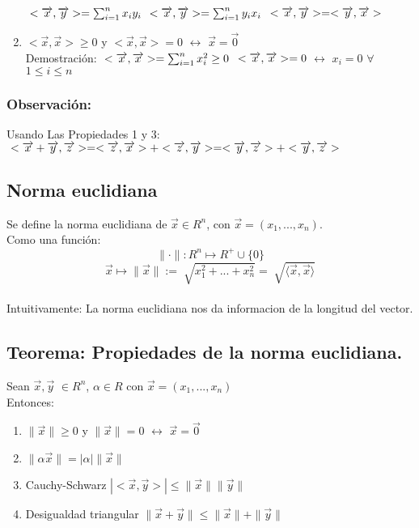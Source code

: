 \documentclass{book}
\begin{document}
\begin{enumerate}
    $\\<\overrightarrow{x},\overrightarrow{y}>=\sum_{i=1}^{n}x_{i}y_{i}$
    $\\<\overrightarrow{x},\overrightarrow{y}>=\sum_{i=1}^{n}y_{i}x_{i}$
    $\\<\overrightarrow{x},\overrightarrow{y}>=<\overrightarrow{y},\overrightarrow{x}>$
    \item $<\overrightarrow{x},\overrightarrow{x}>\geq0$ y $<\overrightarrow{x},\overrightarrow{x}>=0$ $\longleftrightarrow$ $\overrightarrow{x}=\overrightarrow{0}$
    \\Demostración:
    $\\<\overrightarrow{x},\overrightarrow{x}>=\sum_{i=1}^{n}x_{i}^2\geq0$ 
    $\\<\overrightarrow{x},\overrightarrow{x}>=0$ $\longleftrightarrow$ $x_{i}=0$ $\forall$ $1\leq i\leq n$

\end{enumerate}
\subsubsection*{Observación:}
Usando Las Propiedades 1 y 3:
$\\<\overrightarrow{x}+\overrightarrow{y},\overrightarrow{z}>=<\overrightarrow{z},\overrightarrow{x}>+<\overrightarrow{z},\overrightarrow{y}>=<\overrightarrow{y},\overrightarrow{z}>+<\overrightarrow{y},\overrightarrow{z}>$
\subsection*{Norma euclidiana}
Se define la norma euclidiana de $\overrightarrow{x}\in R^n$, con $\overrightarrow{x}=(x_{1},...,x_{n})$.
\\Como una función:
$$\|\cdot\|:R^n \mapsto R^+ \cup \{0\}$$
$$\overrightarrow{x}\mapsto\|\overrightarrow{x}\|:=\sqrt[]{x_{1}^2+...+x_{n}^2}=\sqrt[]{\langle\overrightarrow{x},\overrightarrow{x}\rangle}$$
\\Intuitivamente: La norma euclidiana nos da informacion de la longitud del vector.
\subsection*{Teorema: Propiedades de la norma euclidiana.}
Sean $\overrightarrow{x},\overrightarrow{y}$ $\in R^n$, $\alpha \in R$ con $\overrightarrow{x}=(x_{1},...,x_{n})$
\\Entonces:
\begin{enumerate}
    \item $\|\overrightarrow{x}\|\geq0$ y $\|\overrightarrow{x}\|=0$ $\longleftrightarrow$ $\overrightarrow{x}=\overrightarrow{0}$
    \item $\|\alpha\overrightarrow{x}\|=|\alpha|\|\overrightarrow{x}\|$
    \item Cauchy-Schwarz $|<\overrightarrow{x},\overrightarrow{y}>|\leq\|\overrightarrow{x}\|\|\overrightarrow{y}\|$  
    \item Desigualdad triangular $\|\overrightarrow{x}+\overrightarrow{y}\|\leq\|\overrightarrow{x}\|+\|\overrightarrow{y}\|$
\end{enumerate}
\end{document}

